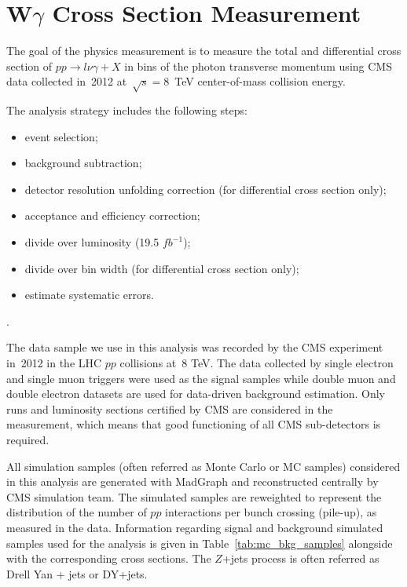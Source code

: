 \chapter{W$\gamma$ Cross Section Measurement}
\label{sec:AN_WgMeas}

The goal of the physics measurement is to measure the total and differential cross section of $pp \rightarrow l\nu\gamma + X$ in bins of the photon transverse momentum using CMS data collected in~2012 at~$\sqrt{s}=8$~TeV center-of-mass collision energy. 

The analysis strategy includes the following steps:
\begin{itemize}
  \item event selection;
  \item background subtraction;
  \item detector resolution unfolding correction (for differential cross section only);
  \item acceptance and efficiency correction;
  \item divide over luminosity (19.5 $fb^{-1}$);
  \item divide over bin width (for differential cross section only);
  \item estimate systematic errors.
\end{itemize}
.

The data sample we use in this analysis was recorded by the CMS experiment in~2012 in the LHC $pp$ collisions at~8 TeV. The data collected by single electron and single muon triggers were used as the signal samples while double muon and double electron datasets are used for data-driven background estimation. Only runs and luminosity sections certified by CMS are considered in the measurement, which means that good functioning of all CMS sub-detectors is required.

All simulation samples (often referred as Monte Carlo or MC samples) considered in this analysis are generated with MadGraph and reconstructed centrally by CMS simulation team. The simulated samples are reweighted to represent the distribution of the number of $pp$ interactions per bunch crossing (pile-up), as measured in the data. Information regarding signal and background simulated samples used for the analysis is given in Table~\ref{tab:mc_bkg_samples} alongside with the corresponding cross sections. The $Z$+jets process is often referred as Drell Yan + jets or DY+jets.

